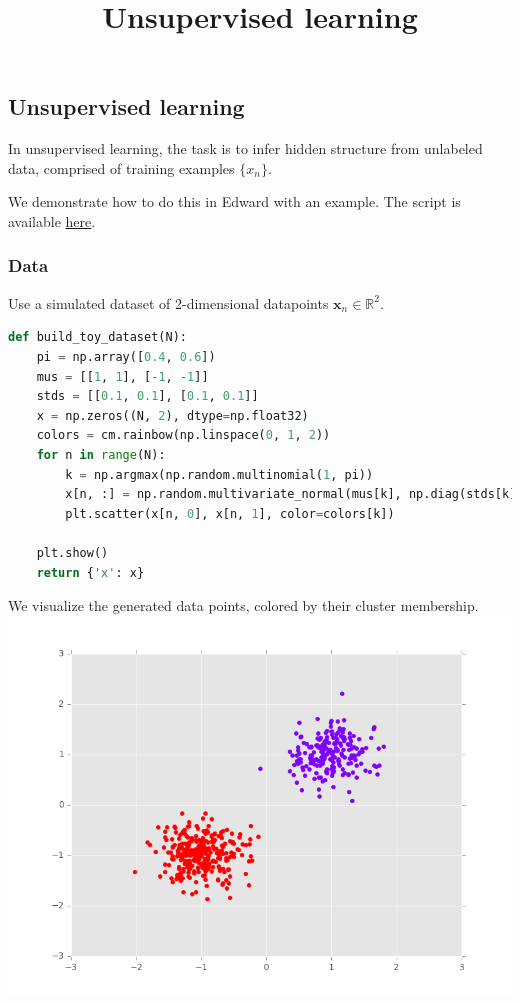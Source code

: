\title{Unsupervised learning}

\subsection{Unsupervised learning}

In unsupervised learning, the task is to infer hidden structure from
unlabeled data, comprised of training examples $\{x_n\}$.

We demonstrate how to do this in Edward with an example.
The script is available
\href{https://github.com/blei-lab/edward/blob/master/examples/mixture_gaussian.py}
{here}.


\subsubsection{Data}

Use a simulated dataset of 2-dimensional datapoints
$\mathbf{x}_n\in\mathbb{R}^2$.
\begin{lstlisting}[language=Python]
def build_toy_dataset(N):
    pi = np.array([0.4, 0.6])
    mus = [[1, 1], [-1, -1]]
    stds = [[0.1, 0.1], [0.1, 0.1]]
    x = np.zeros((N, 2), dtype=np.float32)
    colors = cm.rainbow(np.linspace(0, 1, 2))
    for n in range(N):
        k = np.argmax(np.random.multinomial(1, pi))
        x[n, :] = np.random.multivariate_normal(mus[k], np.diag(stds[k]))
        plt.scatter(x[n, 0], x[n, 1], color=colors[k])

    plt.show()
    return {'x': x}
\end{lstlisting}

We visualize the generated data points, colored by their cluster membership.
\includegraphics[width=700px]{images/unsupervised-fig0.png}

